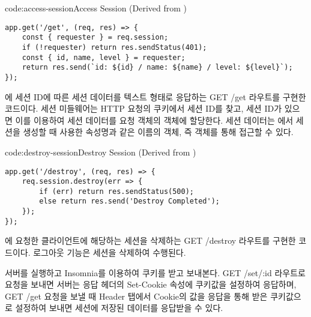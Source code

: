 \begin{codeenv}{code:access-session}{Access Session (Derived from )}\begin{verbatim}
app.get('/get', (req, res) => {
    const { requester } = req.session;
    if (!requester) return res.sendStatus(401);
    const { id, name, level } = requester;
    return res.send(`id: ${id} / name: ${name} / level: ${level}`);
});
\end{verbatim}
\end{codeenv}

\은 에 세션 ID에 따른 세션 데이터를 텍스트 형태로 응답하는 GET /get 라우트를 구현한 코드이다. 세션 미들웨어는 HTTP 요청의 쿠키에서 세션 ID를 찾고, 세션 ID가 있으면 이를 이용하여 세션 데이터를 요청 객체의  객체에 할당한다. 세션 데이터는 에서 세션을 생성할 때 사용한 속성명과 같은 이름의 객체, 즉  객체를 통해 접근할 수 있다.

\begin{codeenv}{code:destroy-session}{Destroy Session (Derived from )}\begin{verbatim}
app.get('/destroy', (req, res) => {
    req.session.destroy(err => {
        if (err) return res.sendStatus(500);
        else return res.send('Destroy Completed');
    });
});
\end{verbatim}
\end{codeenv}

\은 에 요청한 클라이언트에 해당하는 세션을 삭제하는 GET /destroy 라우트를 구현한 코드이다. 로그아웃 기능은 세션을 삭제하여 수행된다.


서버를 실행하고 Insomnia를 이용하여 쿠키를 받고 보내본다. GET /set/:id 라우트로 요청을 보내면 서버는 응답 헤더의 Set-Cookie 속성에 쿠키값을 설정하여 응답하며, GET /get 요청을 보낼 때 Header 탭에서 Cookie의 값을 응답을 통해 받은 쿠키값으로 설정하여 보내면 세션에 저장된 데이터를 응답받을 수 있다.


